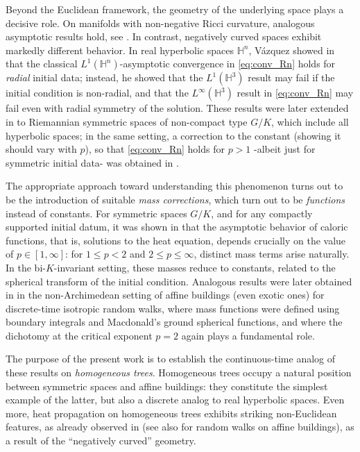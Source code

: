 \documentclass[11pt,a4paper,reqno]{amsart}
\theoremstyle{plain}
\theoremstyle{remark}
\theoremstyle{definition}
\theoremstyle{remark}
\numberwithin{equation}{section}
\begin{document}
Beyond the Euclidean framework, the geometry of the underlying space plays a decisive role. On manifolds with non-negative Ricci curvature, analogous asymptotic results hold, see \cite{GPZ}. In contrast, negatively curved spaces exhibit markedly different behavior. In real hyperbolic spaces $\mathbb{H}^n$, Vázquez showed in \cite{Vaz} that the classical $L^{1}(\mathbb{H}^n)$-asymptotic convergence in \eqref{eq:conv_Rn} holds for \textit{radial} initial data; instead, he showed that the $L^1(\mathbb{H}^3)$ result may fail if the initial condition is non-radial, and that the $L^{\infty}(\mathbb{H}^3)$ result in \eqref{eq:conv_Rn} may fail even with radial symmetry of the solution. These results were later extended in \cite{APZ} to Riemannian symmetric spaces of non-compact type $G/K$, which include all hyperbolic spaces; in the same setting, a correction to the constant (showing it should vary with $p$), so that \eqref{eq:conv_Rn} holds for $p>1$ -albeit just for symmetric initial data- was obtained in \cite{Naik}.

The appropriate approach toward understanding this phenomenon turns out to be the introduction of suitable \emph{mass corrections}, which turn out to be \textit{functions} instead of constants. For symmetric spaces $G/K$, and for any compactly supported initial datum, it was shown in \cite{P1} that the asymptotic behavior of caloric functions, that is, solutions to the heat equation, depends crucially on the value of $p\in[1,\infty]$: for $1\leq p<2$ and $2\leq p\leq\infty$, distinct mass terms arise naturally. In the bi-$K$-invariant setting, these masses reduce to constants, related to the spherical transform of the initial condition. Analogous results were later obtained in \cite{PT} in the non-Archimedean setting of affine buildings (even exotic ones) for discrete-time isotropic random walks, where mass functions were defined using boundary integrals and Macdonald's ground spherical functions, and where the dichotomy at the critical exponent $p=2$ again plays a fundamental role.

The purpose of the present work is to establish the continuous-time analog of these results on \emph{homogeneous trees}. Homogeneous trees occupy a natural position between symmetric spaces and affine buildings: they constitute the simplest example of the latter, but also a discrete analog to real hyperbolic spaces. Even more, heat propagation on homogeneous trees exhibits striking non-Euclidean features, as already observed in \cite{CMS, MedSe} (see also \cite{T} for random walks on affine buildings), as a result of the ``negatively curved'' geometry.
\end{document}
